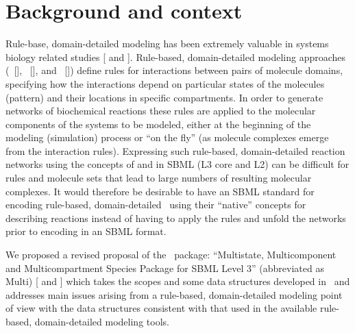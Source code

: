 
\section{Background and context}
\label{def:Background}

Rule-base, domain-detailed modeling has been extremely valuable in systems biology related studies [\cite{ref:nathan2015} and \cite{ref:jamesFader2013}]. Rule-based, domain-detailed modeling approaches (\BioNetGen\ [\cite{ref:bionetgen2009}], \Kappa\ [\cite{ref:kappa2004}], and \Simmune\ [\cite{ref:simmune2012, ref:simmune2006}]) define rules for interactions between pairs of molecule domains, specifying how the interactions depend on particular states of the molecules (pattern) and their locations in specific compartments. In order to generate networks of biochemical reactions these rules are applied to the molecular components of the systems to be modeled, either at the beginning of the modeling (simulation) process or ``on the fly'' (as molecule complexes emerge from the interaction rules). Expressing such rule-based, domain-detailed reaction networks using the concepts of \Species and \Compartment in SBML (L3 core and L2) can be difficult for rules and molecule sets that lead to large numbers of resulting molecular complexes. It would therefore be desirable to have an SBML standard for encoding rule-based, domain-detailed \smodels\ using their ``native'' concepts for describing reactions instead of having to apply the rules and unfold the networks prior to encoding in an SBML format.

We proposed a revised proposal of the \multi\ package: ``Multistate, Multicomponent and Multicompartment Species Package for SBML Level 3''  (abbreviated as Multi) [\cite{ref:revisedMulti} and \cite{ref:multiproposal280}] which takes the scopes and some data structures developed in \multiOneProposalWC\ and addresses main issues arising from a rule-based, domain-detailed modeling point of view with the data structures consistent with that used in the available rule-based, domain-detailed modeling tools. 

\label{def:OtherRuleBasedModels}


